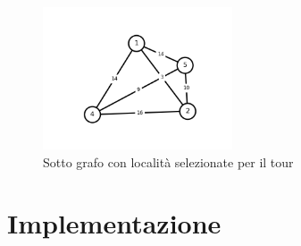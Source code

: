 \documentclass{article}
\begin{document}
\begin{figure}[h]
  \centering
  \includegraphics[width=0.50\textwidth]{img/graphOutput.png}
  \caption{Sotto grafo con località selezionate per il tour}\label{fig:graphOutput.png}
\end{figure}
\clearpage
\pagebreak


\section*{Implementazione}

\end{document}
